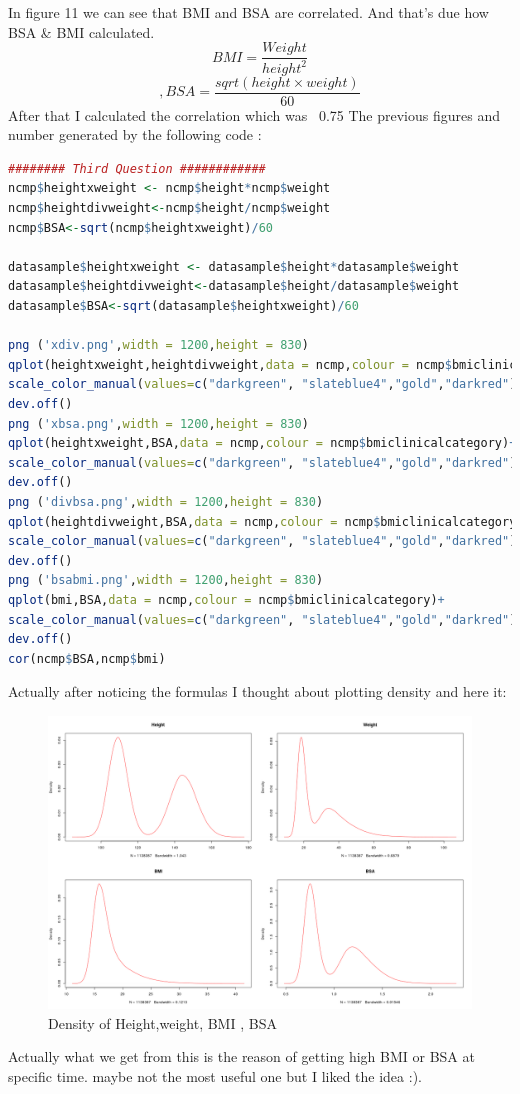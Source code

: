 \documentclass{article}
\begin{document}
	In figure 11 we can see that BMI and BSA are correlated. And that's due how BSA \& BMI calculated.
\[BMI = \frac{Weight}{height^2}\]\[ , BSA = \frac{sqrt(height\times weight)}{60}\]
After that I calculated the correlation which was ~0.75
The previous figures and number generated by the following code :
\begin{lstlisting}[language=R]
######## Third Question ############
ncmp$heightxweight <- ncmp$height*ncmp$weight
ncmp$heightdivweight<-ncmp$height/ncmp$weight
ncmp$BSA<-sqrt(ncmp$heightxweight)/60

datasample$heightxweight <- datasample$height*datasample$weight
datasample$heightdivweight<-datasample$height/datasample$weight
datasample$BSA<-sqrt(datasample$heightxweight)/60

png ('xdiv.png',width = 1200,height = 830)
qplot(heightxweight,heightdivweight,data = ncmp,colour = ncmp$bmiclinicalcategory)+
scale_color_manual(values=c("darkgreen", "slateblue4","gold","darkred"))
dev.off()
png ('xbsa.png',width = 1200,height = 830)
qplot(heightxweight,BSA,data = ncmp,colour = ncmp$bmiclinicalcategory)+
scale_color_manual(values=c("darkgreen", "slateblue4","gold","darkred"))
dev.off()
png ('divbsa.png',width = 1200,height = 830)
qplot(heightdivweight,BSA,data = ncmp,colour = ncmp$bmiclinicalcategory)+
scale_color_manual(values=c("darkgreen", "slateblue4","gold","darkred"))
dev.off()
png ('bsabmi.png',width = 1200,height = 830)
qplot(bmi,BSA,data = ncmp,colour = ncmp$bmiclinicalcategory)+
scale_color_manual(values=c("darkgreen", "slateblue4","gold","darkred"))
dev.off()
cor(ncmp$BSA,ncmp$bmi)
\end{lstlisting}
Actually after noticing the formulas I thought about plotting density and here it: 
\begin{figure}[H]
\begin{center}
\includegraphics[scale=0.4]{density.png}
\end{center}
\caption{Density of Height,weight, BMI , BSA}
\end{figure}
Actually what we get from this is the reason of getting high BMI or BSA at specific time. maybe not the most useful one but I liked the idea :).
\end{document}

